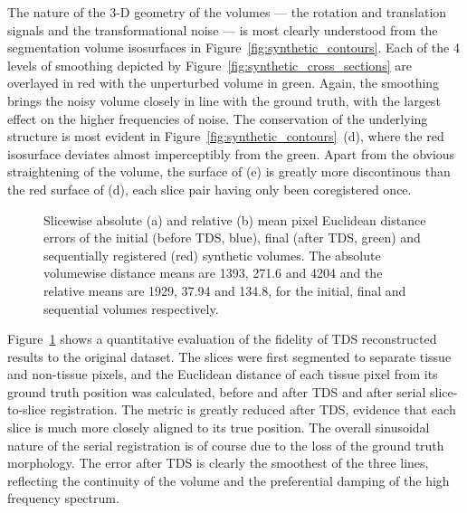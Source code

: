   The nature of the 3-D geometry of the volumes --- the rotation and translation signals and the transformational noise --- is most clearly understood from the segmentation volume isosurfaces in Figure~\ref{fig:synthetic_contours}. Each of the 4 levels of smoothing depicted by Figure~\ref{fig:synthetic_cross_sections} are overlayed in red with the unperturbed volume in green. Again, the smoothing brings the noisy volume closely in line with the ground truth, with the largest effect on the higher frequencies of noise. The conservation of the underlying structure is most evident in Figure~\ref{fig:synthetic_contours}~(d), where the red isosurface deviates almost imperceptibly from the green. Apart from the obvious straightening of the volume, the surface of (e) is greatly more discontinous than the red surface of (d), each slice pair having only been coregistered once.

  \begin{figure}[!t]
    \caption{Slicewise absolute (a) and relative (b) mean pixel Euclidean distance errors of the initial (before TDS, blue), final (after TDS, green) and sequentially registered (red) synthetic volumes. The absolute volumewise distance means are 1393, 271.6 and 4204 and the relative means are 1929, 37.94 and 134.8, for the initial, final and sequential volumes respectively.}
    \label{fig:synthetic_errors}
  \end{figure}
  Figure~\ref{fig:synthetic_errors} shows a quantitative evaluation of the fidelity of TDS reconstructed results to the original dataset. The slices were first segmented to separate tissue and non-tissue pixels, and the Euclidean distance of each tissue pixel from its ground truth position was calculated, before and after TDS and after serial slice-to-slice registration. The metric is greatly reduced after TDS, evidence that each slice is much more closely aligned to its true position. The overall sinusoidal nature of the serial registration is of course due to the loss of the ground truth morphology. The error after TDS is clearly the smoothest of the three lines, reflecting the continuity of the volume and the preferential damping of the high frequency spectrum.

